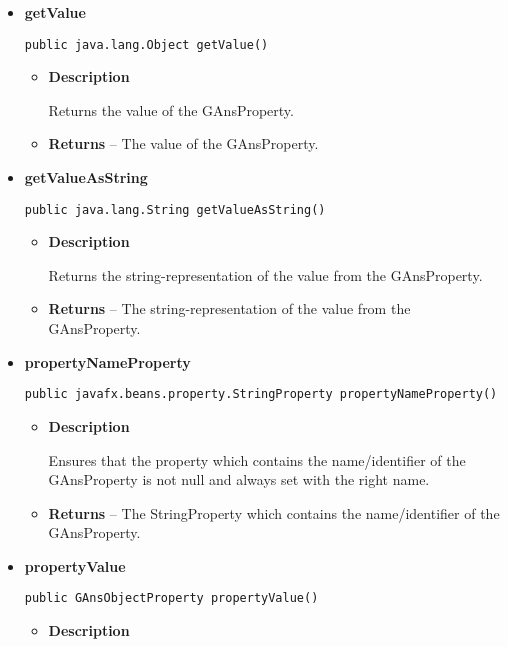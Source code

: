 {{{{{\begin{itemize}
{\begin{itemize}
{Returns the name/identifier of the GAnsProperty.
}
\item{{\bf  Returns} -- 
The name/identifier of the GAnsProperty. 
}%
\end{itemize}
}%
\item{ 
{\bf  getValue}\\
\begin{lstlisting}[frame=none]
public java.lang.Object getValue()\end{lstlisting} %
\begin{itemize}
\item{
{\bf  Description}

Returns the value of the GAnsProperty.
}
\item{{\bf  Returns} -- 
The value of the GAnsProperty. 
}%
\end{itemize}
}%
\item{ 
{\bf  getValueAsString}\\
\begin{lstlisting}[frame=none]
public java.lang.String getValueAsString()\end{lstlisting} %
\begin{itemize}
\item{
{\bf  Description}

Returns the string-representation of the value from the GAnsProperty.
}
\item{{\bf  Returns} -- 
The string-representation of the value from the GAnsProperty. 
}%
\end{itemize}
}%
\item{ 
{\bf  propertyNameProperty}\\
\begin{lstlisting}[frame=none]
public javafx.beans.property.StringProperty propertyNameProperty()\end{lstlisting} %
\begin{itemize}
\item{
{\bf  Description}

Ensures that the property which contains the name/identifier of the GAnsProperty is not null and always set with the right name.
}
\item{{\bf  Returns} -- 
The StringProperty which contains the name/identifier of the GAnsProperty. 
}%
\end{itemize}
}%
\item{ 
{\bf  propertyValue}\\
\begin{lstlisting}[frame=none]
public GAnsObjectProperty propertyValue()\end{lstlisting} %
\begin{itemize}
\item{
{\bf  Description}

}
\end{itemize}}
\end{itemize}}}}}}
